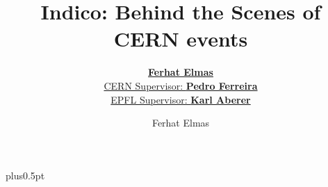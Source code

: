 \documentclass[oneside,11pt]{Latex/Classes/PhDthesisPSnPDF}
\title{Indico: Behind the Scenes of CERN events}
\author{\href{mailto:ferhat.elmas@epfl.ch}{\textbf{Ferhat Elmas}}\\ 
  \href{mailto:pedro.ferreira@cern.ch}{CERN Supervisor: \textbf{Pedro Ferreira}}  \\
  \href{mailto:karl.aberer@epfl.ch}{EPFL Supervisor: \textbf{Karl Aberer}}  \\
  }
\author{Ferhat Elmas}
\begin{document}

\renewcommand\baselinestretch{1.0}
\baselineskip=14pt plus0.5pt
 

\maketitle  %





\frontmatter


\setcounter{secnumdepth}{3} %
\setcounter{tocdepth}{3}    %
\tableofcontents            %

\mainmatter

\renewcommand{\chaptername}{} %


	  
					










\begin{tiny} %
  \renewcommand{\bibname}{References} %
\end{tiny}
\end{document}
